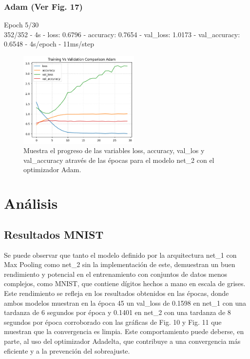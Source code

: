 \documentclass[journal]{IEEEtai}
\begin{document}
\subsubsection{\textbf{Adam} (Ver Fig. 17)} 
\hfill\break
Epoch 5/30\\
352/352 - 4s - loss: 0.6796 - accuracy: 0.7654 - val\_loss: 1.0173 - val\_accuracy: 0.6548 - 4s/epoch - 11ms/step

\begin{figure}[h!]
\centering
\includegraphics[width=6cm]{img/net2adam.png}
\caption{Muestra el progreso de las variables loss, accuracy, val\_los y val\_accuracy através de las épocas para el modelo net\_2 con el optimizador Adam.}
\label{fig: net2adam}
\end{figure}

\section{Análisis}

\subsection{Resultados MNIST}

Se puede observar que tanto el modelo definido por la arquitectura net\_1 con Max Pooling como net\_2 sin la implementación de este, demuestran un buen rendimiento y potencial en el entrenamiento con conjuntos de datos menos complejos, como MNIST, que contiene dígitos hechos a mano en escala de grises. Este rendimiento se refleja en los resultados obtenidos en las épocas, donde ambos modelos muestran en la época 45 un val\_loss de 0.1598 en net\_1 con una tardanza de 6 segundos por época y 0.1401 en net\_2 con una tardanza de 8 segundos por época corroborado con las gráficas de Fig. 10 y Fig. 11 que muestran que la convergencia es limpia. Este comportamiento puede deberse, en parte, al uso del optimizador Adadelta, que contribuye a una convergencia más eficiente y a la prevención del sobreajuste.
\end{document}
